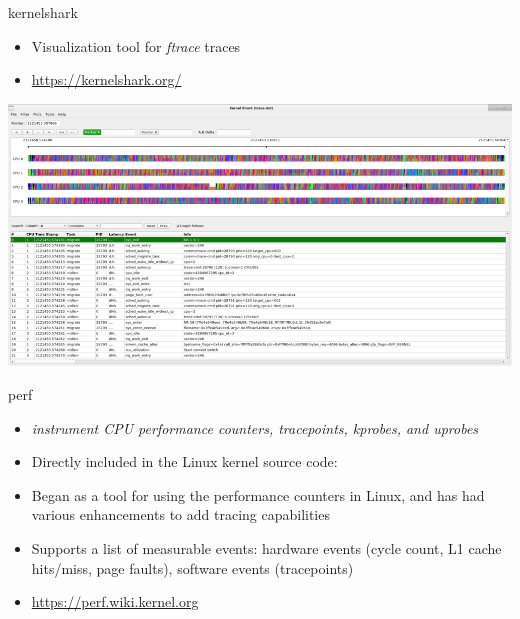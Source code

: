 \begin{frame}{kernelshark}
  \begin{itemize}
  \item Visualization tool for {\em ftrace} traces
  \item \url{https://kernelshark.org/}
  \end{itemize}
  \begin{center}
    \includegraphics[height=0.6\textheight]{slides/linux-app-tracing/kernelshark.png}
  \end{center}
\end{frame}

\begin{frame}{perf}
  \begin{itemize}
  \item {\em instrument CPU performance counters, tracepoints, kprobes, and uprobes}
  \item Directly included in the Linux kernel source code: 
  \item Began as a tool for using the performance counters in Linux,
    and has had various enhancements to add tracing capabilities
  \item Supports a list of measurable events: hardware events (cycle
    count, L1 cache hits/miss, page faults), software events
    (tracepoints)
  \item \url{https://perf.wiki.kernel.org}
  \end{itemize}
\end{frame}


